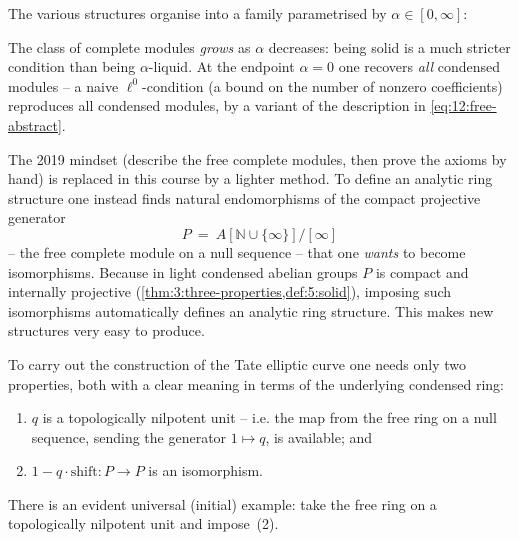 \begin{remark}
\label{rmk:12:states-of-matter}
The various structures organise into a family parametrised by
$\alpha\in[0,\infty]$:
\begin{center}
\end{center}
The class of complete modules \emph{grows} as $\alpha$ decreases: being solid is
a much stricter condition than being $\alpha$-liquid. At the endpoint $\alpha=0$
one recovers \emph{all} condensed modules -- a naive $\ell^{0}$-condition (a
bound on the number of nonzero coefficients) reproduces all condensed modules,
by a variant of the description in \eqref{eq:12:free-abstract}.
\end{remark}

\begin{remark}
\label{rmk:12:mindset-endomorphisms}
The 2019 mindset (describe the free complete modules, then prove the axioms by
hand) is replaced in this course by a lighter method. To define an analytic ring
structure one instead finds natural endomorphisms of the compact projective
generator
\begin{equation*}
P\ =\ A[\mathbb{N}\cup\{\infty\}]\big/[\infty]
\end{equation*}
-- the free complete module on a null sequence -- that one \emph{wants} to
become isomorphisms. Because in light condensed abelian groups $P$ is compact and
internally projective (\cref{thm:3:three-properties,def:5:solid}), imposing such
isomorphisms automatically defines an analytic ring structure. This makes new
structures very easy to produce.
\end{remark}

\begin{remark}
\label{rmk:12:tate-needs-two}
To carry out the construction of the Tate elliptic curve one needs only two
properties, both with a clear meaning in terms of the underlying condensed ring:
\begin{enumerate}
\item $q$ is a topologically nilpotent unit -- i.e. the map from the free ring
on a null sequence, sending the generator $1\mapsto q$, is available; and
\item $1-q\cdot\mathrm{shift}\colon P\to P$ is an isomorphism.
\end{enumerate}
There is an evident universal (initial) example: take the free ring on a
topologically nilpotent unit and impose~(2).
\end{remark}

